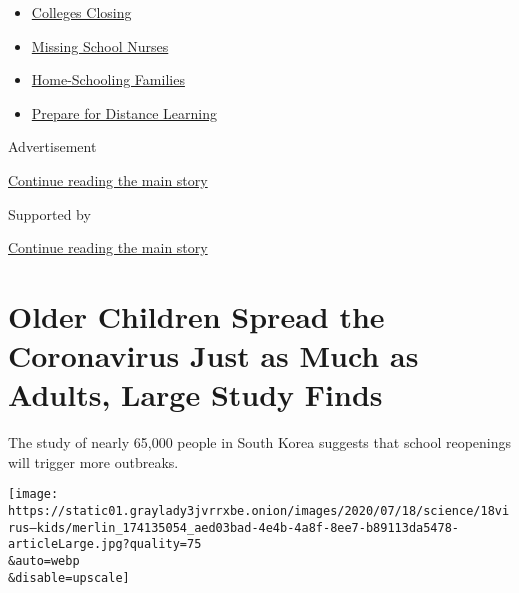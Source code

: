 \begin{itemize}
\tightlist
\item
  \href{https://www.nytimes3xbfgragh.onion/2020/08/19/us/colleges-closing-covid.html?name=styln-coronavirus-schools-reopening\&region=TOP_BANNER\&variant=undefined\&block=storyline_menu_recirc\&action=click\&pgtype=Article\&impression_id=93ce2300-e3b4-11ea-96b6-7d25c67b750c}{Colleges
  Closing}
\item
  \href{https://www.nytimes3xbfgragh.onion/2020/08/20/us/schools-reopening-nurses-covid.html?name=styln-coronavirus-schools-reopening\&region=TOP_BANNER\&variant=undefined\&block=storyline_menu_recirc\&action=click\&pgtype=Article\&impression_id=93ce2301-e3b4-11ea-96b6-7d25c67b750c}{Missing
  School Nurses}
\item
  \href{https://www.nytimes3xbfgragh.onion/2020/08/18/parenting/homeschool-families.html?name=styln-coronavirus-schools-reopening\&region=TOP_BANNER\&variant=undefined\&block=storyline_menu_recirc\&action=click\&pgtype=Article\&impression_id=93ce2302-e3b4-11ea-96b6-7d25c67b750c}{Home-Schooling
  Families}
\item
  \href{https://www.nytimes3xbfgragh.onion/2020/08/05/parenting/parents-distance-learning.html?name=styln-coronavirus-schools-reopening\&region=TOP_BANNER\&variant=undefined\&block=storyline_menu_recirc\&action=click\&pgtype=Article\&impression_id=93ce2303-e3b4-11ea-96b6-7d25c67b750c}{Prepare
  for Distance Learning}
\end{itemize}

Advertisement

\protect\hyperlink{after-top}{Continue reading the main story}

Supported by

\protect\hyperlink{after-sponsor}{Continue reading the main story}

\hypertarget{older-children-spread-the-coronavirus-just-as-much-as-adults-large-study-finds}{%
\section{Older Children Spread the Coronavirus Just as Much as Adults,
Large Study
Finds}\label{older-children-spread-the-coronavirus-just-as-much-as-adults-large-study-finds}}

The study of nearly 65,000 people in South Korea suggests that school
reopenings will trigger more outbreaks.

\texttt{[image: https://static01.graylady3jvrrxbe.onion/images/2020/07/18/science/18virus--kids/merlin\_174135054\_aed03bad-4e4b-4a8f-8ee7-b89113da5478-articleLarge.jpg?quality=75\\\&auto=webp\\\&disable=upscale]}

